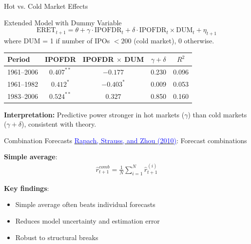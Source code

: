 \documentclass{beamer}
\begin{document}
\begin{frame}{Hot vs. Cold Market Effects}
\begin{block}{Extended Model with Dummy Variable}
\[
\text{ERET}_{t+1} = \theta + \gamma \cdot \text{IPOFDR}_t + \delta \cdot \text{IPOFDR}_t \times \text{DUM}_t + \eta_{t+1}
\]
where DUM = 1 if number of IPOs $< 200$ (cold market), 0 otherwise.
\end{block}

\begin{table}[h]
\centering
\small
\begin{tabular}{lcccc}
\toprule
Period & IPOFDR & IPOFDR $\times$ DUM & $\gamma + \delta$ & $R^2$ \\
\midrule
1961--2006 & $0.407^{**}$ & $-0.177$ & 0.230 & 0.096 \\
1961--1982 & $0.412^{*}$ & $-0.403^{*}$ & 0.009 & 0.053 \\
1983--2006 & $0.524^{**}$ & $0.327$ & 0.850 & 0.160 \\
\bottomrule
\end{tabular}
\end{table}

\textbf{Interpretation:} Predictive power stronger in hot markets ($\gamma$) than cold markets ($\gamma + \delta$), consistent with theory.
\end{frame}

\begin{frame}{Combination Forecasts}
	\href{https://doi.org/10.1093/rfs/hhp063}{\textcolor{blue}{Rapach, Strauss, and Zhou (2010)}}: Forecast combinations
	
	\vspace{5pt}
	\textbf{Simple average}:
	\begin{align*}
		\hat{r}_{t+1}^{comb} = \frac{1}{N}\sum_{i=1}^{N}\hat{r}_{t+1}^{(i)}
	\end{align*}
	
	\textbf{Key findings}:
	\begin{itemize}
		\item Simple average often beats individual forecasts
		\item Reduces model uncertainty and estimation error
		\item Robust to structural breaks
	\end{itemize}
\end{frame}

\end{document}
